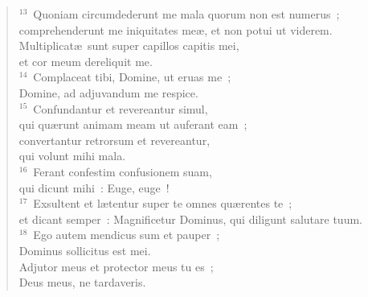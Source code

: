 \begin{verse}
${}^{13}$~Quoniam circumdederunt me mala quorum non est numerus~;\\ comprehenderunt me iniquitates me\ae , et non potui ut viderem.\\ Multiplicat\ae\ sunt super capillos capitis mei,\\ et cor meum dereliquit me.\\
${}^{14}$~Complaceat tibi, Domine, ut eruas me~;\\ Domine, ad adjuvandum me respice.\\
${}^{15}$~Confundantur et revereantur simul,\\ qui qu\ae runt animam meam ut auferant eam~;\\ convertantur retrorsum et revereantur,\\ qui volunt mihi mala.\\
${}^{16}$~Ferant confestim confusionem suam,\\ qui dicunt mihi~: Euge, euge~!\\
${}^{17}$~Exsultent et l\ae tentur super te omnes qu\ae rentes te~;\\ et dicant semper~: Magnificetur Dominus, qui diligunt salutare tuum.\\
${}^{18}$~Ego autem mendicus sum et pauper~;\\ Dominus sollicitus est mei.\\ Adjutor meus et protector meus tu es~;\\ Deus meus, ne tardaveris.\end{verse}



